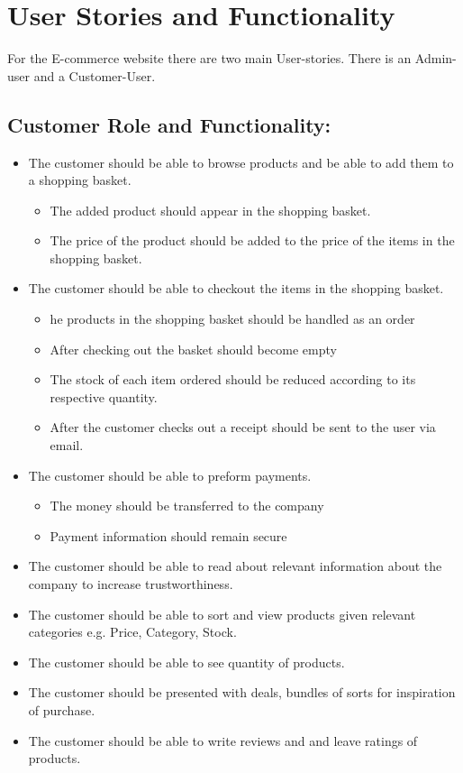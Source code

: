 \section{User Stories and Functionality}

For the E-commerce website there are two main User-stories. There is an Admin-user and a Customer-User.
\\
\subsection{Customer Role and Functionality:}
\begin{itemize}
    \item The customer should be able to browse products and be able to add them to a shopping basket. 
        \begin{itemize}
            \item The added product should appear in the shopping basket. 
            \item The price of the product should be added to the price of the items in the shopping basket.
        \end{itemize}
    \item The customer should be able to checkout the items in the shopping basket.
        \begin{itemize}
            \item he products in the shopping basket should be handled as an order
            
            \item After checking out the basket should become empty
            
            \item The stock of each item ordered should be reduced according to its respective quantity.
            
            \item After the customer checks out a receipt should be sent to the user via email. 
        \end{itemize}
    \item The customer should be able to preform payments. 
        \begin{itemize}
            \item The money should be transferred to the company
            \item Payment information should remain secure
        \end{itemize}
    \item The customer should be able to read about relevant information about the company to increase trustworthiness. 
    \item The customer should be able to sort and view  products given relevant categories e.g. Price, Category, Stock. 
    \item The customer should be able to see quantity of products. 
    \item The customer should be presented with deals, bundles of sorts for inspiration of purchase.
    \item The customer should be able to write reviews and and leave ratings of products. 
\end{itemize}

